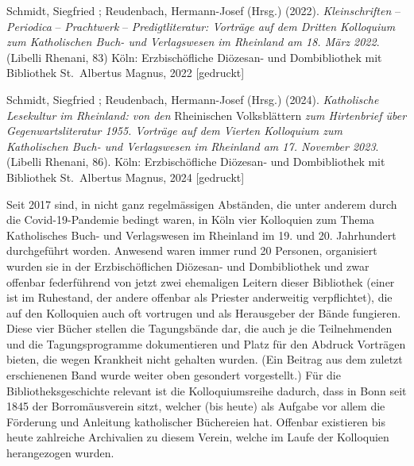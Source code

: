 \documentclass[a4paper,
fontsize=11pt,
oneside,
numbers=noperiodatend,
parskip=half-,
bibliography=totoc,
final
]{scrartcl}
\begin{document}
Schmidt, Siegfried ; Reudenbach, Hermann-Josef (Hrsg.) (2022).
\emph{Kleinschriften} -- \emph{Periodica} -- \emph{Prachtwerk} --
\emph{Predigtliteratur: Vorträge auf dem Dritten Kolloquium zum
Katholischen Buch- und Verlagswesen im Rheinland am 18. März 2022}.
(Libelli Rhenani, 83) Köln: Erzbischöfliche Diözesan- und Dombibliothek
mit Bibliothek St.~Albertus Magnus, 2022 {[}gedruckt{]}

Schmidt, Siegfried ; Reudenbach, Hermann-Josef (Hrsg.) (2024).
\emph{Katholische Lesekultur im Rheinland: von den} Rheinischen
Volksblättern \emph{zum Hirtenbrief über Gegenwartsliteratur 1955.
Vorträge auf dem Vierten Kolloquium zum Katholischen Buch- und
Verlagswesen im Rheinland am 17. November 2023}. (Libelli Rhenani, 86).
Köln: Erzbischöfliche Diözesan- und Dombibliothek mit Bibliothek
St.~Albertus Magnus, 2024 {[}gedruckt{]}

Seit 2017 sind, in nicht ganz regelmässigen Abständen, die unter anderem
durch die Covid-19-Pandemie bedingt waren, in Köln vier Kolloquien zum
Thema Katholisches Buch- und Verlagswesen im Rheinland im 19. und 20.
Jahrhundert durchgeführt worden. Anwesend waren immer rund 20 Personen,
organisiert wurden sie in der Erzbischöflichen Diözesan- und
Dombibliothek und zwar offenbar federführend von jetzt zwei ehemaligen
Leitern dieser Bibliothek (einer ist im Ruhestand, der andere offenbar
als Priester anderweitig verpflichtet), die auf den Kolloquien auch oft
vortrugen und als Herausgeber der Bände fungieren. Diese vier Bücher
stellen die Tagungsbände dar, die auch je die Teilnehmenden und die
Tagungsprogramme dokumentieren und Platz für den Abdruck Vorträgen
bieten, die wegen Krankheit nicht gehalten wurden. (Ein Beitrag aus dem
zuletzt erschienenen Band wurde weiter oben gesondert vorgestellt.) Für
die Bibliotheksgeschichte relevant ist die Kolloquiumsreihe dadurch,
dass in Bonn seit 1845 der Borromäusverein sitzt, welcher (bis heute)
als Aufgabe vor allem die Förderung und Anleitung katholischer
Büchereien hat. Offenbar existieren bis heute zahlreiche Archivalien zu
diesem Verein, welche im Laufe der Kolloquien herangezogen wurden.
\end{document}
